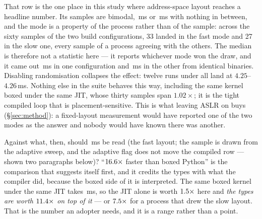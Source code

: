That row is the one place in this study where address-space layout reaches a headline number.
Its samples are bimodal, \,ms or \,ms with nothing in between, and the mode is a
property of the process rather than of the sample: across the sixty samples of the two
build configurations, 33 landed in the fast mode and 27 in the slow one, every sample of a
process agreeing with the others. The median is therefore not a statistic here --- it reports
whichever mode won the draw, and it came out \,ms in one configuration and \,ms in the
other from identical binaries. Disabling randomisation collapses the effect: twelve runs under
 all land at $4.25$--$4.26$\,ms. Nothing else in the suite behaves this way,
including the same kernel boxed under the same JIT, whose thirty samples span $1.02\times$; it
is the tight compiled loop that is placement-sensitive. This is what leaving ASLR on buys
(\S\ref{sec:method}): a fixed-layout measurement would have reported one of the two modes as
the answer and nobody would have known there was another.

Against what, then, should \,ms be read (the fast
layout; the sample is drawn from the adaptive sweep, and the adaptive flag does not move the
compiled row --- shown two paragraphs below)? ``$\meas{ratio:b6_static-fork_static:matmul96_int/fork_static/boxed_python|b6_static-fork_static_adaptive:matmul96_int/fork_static_adaptive/static_jit}{16.6}\times$ faster than boxed Python'' is the
comparison that suggests itself first, and it credits the types with what the compiler did, because the
boxed side of it is interpreted. The same boxed kernel under the same JIT takes \,ms, so
the JIT alone is worth $\meas{ratio:b6_static-fork_static:matmul96_int/fork_static/boxed_python|b6_static-fork_static:matmul96_int/fork_static/boxed_jit}{1.5}\times$ here and \emph{the types are worth $\meas{ratio:b6_static-fork_static:matmul96_int/fork_static/boxed_jit|b6_static-fork_static_adaptive:matmul96_int/fork_static_adaptive/static_jit}{11.4}\times$ on top of
it} --- or $\meas{ratio:b6_static-fork_static:matmul96_int/fork_static/boxed_jit|b6_static-fork_static:matmul96_int/fork_static/static_jit}{7.5}\times$ for a process that drew the slow layout. That is the number an adopter
needs, and it is a range rather than a point.

